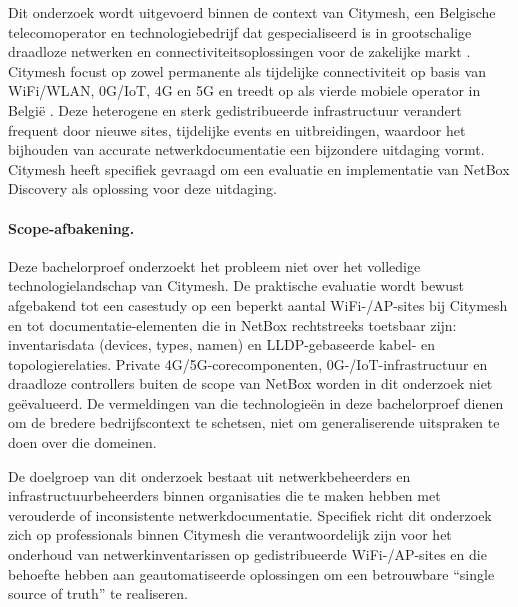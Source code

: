 Dit onderzoek wordt uitgevoerd binnen de context van Citymesh, een Belgische telecomoperator en technologiebedrijf dat gespecialiseerd is in grootschalige draadloze netwerken en connectiviteitsoplossingen voor de zakelijke markt \autocite{CitymeshAbout}. Citymesh focust op zowel permanente als tijdelijke connectiviteit op basis van WiFi/WLAN, 0G/IoT, 4G en 5G en treedt op als vierde mobiele operator in België \autocite{CitymeshAbout,Mice2022}. Deze heterogene en sterk gedistribueerde infrastructuur verandert frequent door nieuwe sites, tijdelijke events en uitbreidingen, waardoor het bijhouden van accurate netwerkdocumentatie een bijzondere uitdaging vormt. Citymesh heeft specifiek gevraagd om een evaluatie en implementatie van NetBox Discovery als oplossing voor deze uitdaging.

\paragraph{Scope-afbakening.} Deze bachelorproef onderzoekt het probleem niet over het volledige technologielandschap van Citymesh. De praktische evaluatie wordt bewust afgebakend tot een casestudy op een beperkt aantal WiFi-/AP-sites bij Citymesh en tot documentatie-elementen die in NetBox rechtstreeks toetsbaar zijn: inventarisdata (devices, types, namen) en LLDP-gebaseerde kabel- en topologierelaties. Private 4G/5G-corecomponenten, 0G-/IoT-infrastructuur en draadloze controllers buiten de scope van NetBox worden in dit onderzoek niet geëvalueerd. De vermeldingen van die technologieën in deze bachelorproef dienen om de bredere bedrijfscontext te schetsen, niet om generaliserende uitspraken te doen over die domeinen.

De doelgroep van dit onderzoek bestaat uit netwerkbeheerders en infrastructuurbeheerders binnen organisaties die te maken hebben met verouderde of inconsistente netwerkdocumentatie. Specifiek richt dit onderzoek zich op professionals binnen Citymesh die verantwoordelijk zijn voor het onderhoud van netwerkinventarissen op gedistribueerde WiFi-/AP-sites en die behoefte hebben aan geautomatiseerde oplossingen om een betrouwbare ``single source of truth'' te realiseren.

\section{}%
\label{sec:opzet-bachelorproef}

